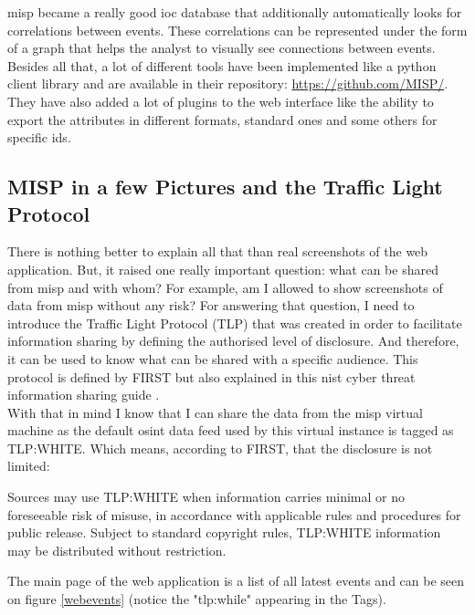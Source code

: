 \documentclass{eplmastersthesis}
\begin{document}
\gls{misp} became a really good \gls{ioc} database that additionally automatically looks for correlations between events. These correlations can be represented under the form of a graph that helps the analyst to visually see connections between events.\\

Besides all that, a lot of different tools have been implemented like a python client library and are available in their repository: \url{https://github.com/MISP/}.
They have also added a lot of plugins to the web interface like the ability to export the attributes in different formats, standard ones and some others for specific \gls{ids}.\\


\subsection{MISP in a few Pictures and the Traffic Light Protocol}
There is nothing better to explain all that than real screenshots of the web application. But, it raised one really important question: what can be shared from \gls{misp} and with whom?
For example, am I allowed to show screenshots of data from \gls{misp} without any risk?
For answering that question, I need to introduce the Traffic Light Protocol (TLP) that was created in order to facilitate information sharing by defining the authorised level of disclosure. And therefore, it can be used to know what can be shared with a specific audience.
This protocol is defined by FIRST \cite{FirstTLP} but also explained in this \gls{nist} cyber threat information sharing guide \cite{johnson2016guide}.\\

With that in mind I know that I can share the data from the \gls{misp} virtual machine as the default \gls{osint} data feed used by this virtual instance is tagged as TLP:WHITE. Which means, according to FIRST, that the disclosure is not limited: \\

\begin{boxedverbatim}
	Sources may use TLP:WHITE when information carries minimal or no foreseeable 
	risk of misuse, in accordance with applicable rules and procedures for public 
	release. Subject to standard copyright rules, TLP:WHITE information may be 
	distributed without restriction.
\end{boxedverbatim}

The main page of the web application is a list of all latest events and can be seen on figure \ref{webevents} (notice the "tlp:while" appearing in the Tags).
\end{document}
